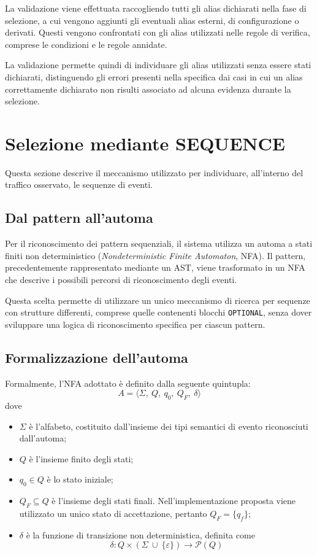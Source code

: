 La validazione viene effettuata raccogliendo tutti gli alias dichiarati nella fase di selezione, a cui vengono aggiunti gli eventuali alias esterni, di configurazione o derivati. Questi vengono confrontati con gli alias utilizzati nelle regole di verifica, comprese le condizioni e le regole annidate. 

La validazione permette quindi di individuare gli alias utilizzati senza essere stati dichiarati, distinguendo gli errori presenti nella specifica dai casi in cui un alias correttamente dichiarato non risulti associato ad alcuna evidenza durante la selezione.


\section{Selezione mediante SEQUENCE}\label{selezione-mediante-sequence}

Questa sezione descrive il meccanismo utilizzato per individuare, all'interno del traffico osservato, le sequenze di eventi.

\subsection{Dal pattern all'automa}\label{il-pattern-sequenziale}

Per il riconoscimento dei pattern sequenziali, il sistema utilizza un automa a stati finiti non deterministico (\emph{Nondeterministic Finite Automaton}, NFA). Il pattern, precedentemente rappresentato mediante un AST, viene trasformato in un NFA che descrive i possibili percorsi di riconoscimento degli eventi.

Questa scelta permette di utilizzare un unico meccanismo di ricerca per sequenze con strutture differenti, comprese quelle contenenti blocchi \texttt{OPTIONAL}, senza dover sviluppare una logica di riconoscimento specifica per ciascun pattern.

\subsection{Formalizzazione dell'automa}\label{formalizzazione-dellautoma}

Formalmente, l'NFA adottato è definito dalla seguente quintupla:
\[
A = \langle \Sigma, \ Q, \ q_{0}, \ Q_{F}, \ \delta \rangle
\] dove

\begin{itemize}
\tightlist
\item
  \(\Sigma\) è l'alfabeto, costituito dall'insieme dei tipi semantici di evento riconosciuti dall'automa;
\item
  \(Q\) è l'insieme finito degli stati;
\item
  \(q_{0} \in Q\) è lo stato iniziale;
\item
  \(Q_{F} \subseteq Q\) è l'insieme degli stati finali. Nell'implementazione proposta viene utilizzato un unico stato di accettazione, pertanto \(Q_{F} = \{ q_{f} \}\);
\item
  \(\delta\) è la funzione di transizione non deterministica, definita come \[\delta: Q \times (\Sigma \ \cup \ \{  \varepsilon \}) \to \mathcal{P}(Q)\]
\end{itemize}


